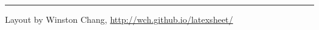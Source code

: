 \documentclass[10pt,landscape]{article}
\makeatletter
\renewcommand{\section}{\@startsection{section}{1}{0mm}%
                                {-1ex plus -.5ex minus -.2ex}%
                                {0.5ex plus .2ex}%
                                {\normalfont\large\bfseries}}
\renewcommand{\subsection}{\@startsection{subsection}{2}{0mm}%
                                {-1explus -.5ex minus -.2ex}%
                                {0.5ex plus .2ex}%
                                {\normalfont\normalsize\bfseries}}
\renewcommand{\subsubsection}{\@startsection{subsubsection}{3}{0mm}%
                                {-1ex plus -.5ex minus -.2ex}%
                                {1ex plus .2ex}%
                                {\normalfont\small\bfseries}}
\makeatother
\begin{document}
\begin{multicols}{3}
\textcolor{white}{\lipsum[1-4]}

\rule{0.3\linewidth}{0.25pt}
\scriptsize

Layout by Winston Chang, \href{http://wch.github.io/latexsheet/}{http://wch.github.io/latexsheet/}




\end{multicols}
\end{document}
